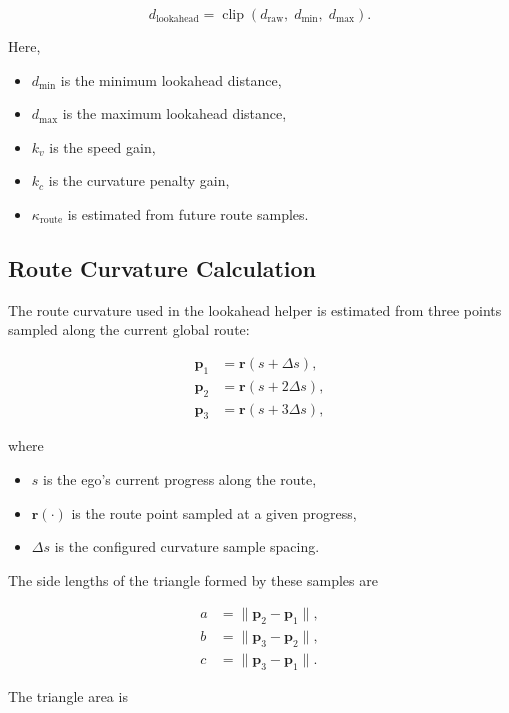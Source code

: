 \documentclass[11pt]{article}
\begin{document}
\begin{equation}
d_{\mathrm{lookahead}}
=
\operatorname{clip}\!\left(d_{\mathrm{raw}},\; d_{\min},\; d_{\max}\right).
\end{equation}

Here,
\begin{itemize}
    \item $d_{\min}$ is the minimum lookahead distance,
    \item $d_{\max}$ is the maximum lookahead distance,
    \item $k_v$ is the speed gain,
    \item $k_c$ is the curvature penalty gain,
    \item $\kappa_{\mathrm{route}}$ is estimated from future route samples.
\end{itemize}

\subsection{Route Curvature Calculation}

The route curvature used in the lookahead helper is estimated from three points
sampled along the current global route:

\begin{align}
\mathbf{p}_1 &= \mathbf{r}(s + \Delta s), \\
\mathbf{p}_2 &= \mathbf{r}(s + 2\Delta s), \\
\mathbf{p}_3 &= \mathbf{r}(s + 3\Delta s),
\end{align}

where
\begin{itemize}
    \item $s$ is the ego's current progress along the route,
    \item $\mathbf{r}(\cdot)$ is the route point sampled at a given progress,
    \item $\Delta s$ is the configured curvature sample spacing.
\end{itemize}

The side lengths of the triangle formed by these samples are

\begin{align}
a &= \|\mathbf{p}_2 - \mathbf{p}_1\|, \\
b &= \|\mathbf{p}_3 - \mathbf{p}_2\|, \\
c &= \|\mathbf{p}_3 - \mathbf{p}_1\|.
\end{align}

The triangle area is
\end{document}
